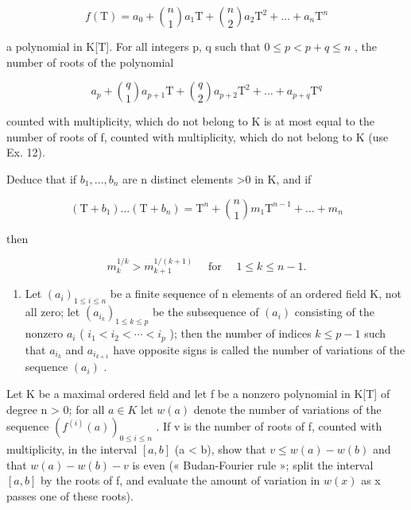 \[
f (\mathrm{T}) = a _ {0} + \binom {n} {1} a _ {1} \mathrm{T} + \binom {n} {2} a _ {2} \mathrm{T} ^ {2} + \dots + a _ {n} \mathrm{T} ^ {n}
\]

a polynomial in K{[}T{]}. For all integers p, q such that \(0 \leqslant p < p + q \leqslant n\) , the number of roots of the polynomial

\[
a _ {p} + \binom{q}{1} a _ {p + 1} \mathrm{T} + \binom{q}{2} a _ {p + 2} \mathrm{T} ^ {2} + \dots + a _ {p + q} \mathrm{T} ^ {q}
\]

counted with multiplicity, which do not belong to K is at most equal to the number of roots of f, counted with multiplicity, which do not belong to K (use Ex. 12).

Deduce that if \(b_{1}, \ldots, b_{n}\) are n distinct elements \textgreater0 in K, and if

\[
\left(\mathrm{T} + b _ {1}\right) \dots \left(\mathrm{T} + b _ {n}\right) = \mathrm{T} ^ {n} + \binom {n} {1} m _ {1} \mathrm{T} ^ {n - 1} + \dots + m _ {n}
\]

then

\[
m _ {k} ^ {1 / k} > m _ {k + 1} ^ {1 / (k + 1)} \quad \text { for } \quad 1 \leqslant k \leqslant n - 1.
\]

\begin{enumerate}
\def\labelenumi{\arabic{enumi})}
\setcounter{enumi}{20}
\tightlist
\item
  Let \((a_{i})_{1 \leqslant i \leqslant n}\) be a finite sequence of n elements of an ordered field K, not all zero; let \((a_{i_{k}})_{1 \leqslant k \leqslant p}\) be the subsequence of \((a_{i})\) consisting of the nonzero \(a_{i}\) ( \(i_{1} < i_{2} < \cdots < i_{p}\) ); then the number of indices \(k \leqslant p - 1\) such that \(a_{i_{k}}\) and \(a_{i_{k+1}}\) have opposite signs is called the number of variations of the sequence \((a_{i})\) .
\end{enumerate}

Let K be a maximal ordered field and let f be a nonzero polynomial in K{[}T{]} of degree n \textgreater{} 0; for all \(a \in K\) let \(w(a)\) denote the number of variations of the sequence \((f^{(i)}(a))_{0 \leq i \leq n}\) . If v is the number of roots of f, counted with multiplicity, in the interval \([a, b]\) (a \textless{} b), show that \(v \leq w(a) - w(b)\) and that \(w(a) - w(b) - v\) is even (« Budan-Fourier rule »; split the interval \([a, b]\) by the roots of f, and evaluate the amount of variation in \(w(x)\) as x passes one of these roots).

